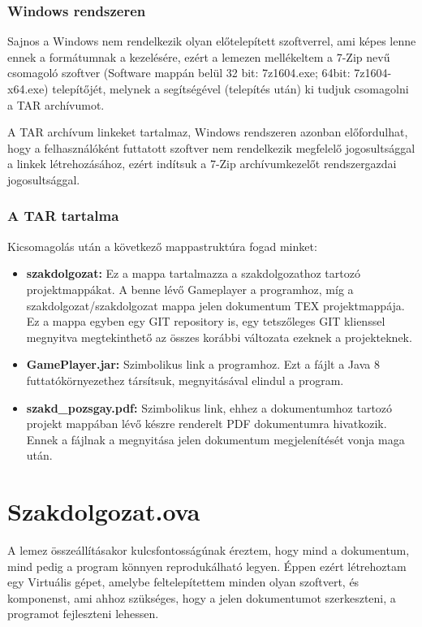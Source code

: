 \subsubsection{Windows rendszeren}
Sajnos a Windows nem rendelkezik olyan előtelepített szoftverrel, ami képes lenne ennek a formátumnak a kezelésére, ezért a lemezen mellékeltem a 7-Zip nevű csomagoló szoftver (Software mappán belül 32 bit: 7z1604.exe; 64bit: 7z1604-x64.exe) telepítőjét, melynek a segítségével (telepítés után) ki tudjuk csomagolni a TAR archívumot.

\begin{remark}
	A TAR archívum linkeket tartalmaz, Windows rendszeren azonban előfordulhat, hogy a felhasználóként futtatott szoftver nem rendelkezik megfelelő jogosultsággal a linkek létrehozásához, ezért indítsuk a 7-Zip archívumkezelőt rendszergazdai jogosultsággal.
\end{remark}

\subsubsection{A TAR tartalma}
Kicsomagolás után a következő mappastruktúra fogad minket:
\begin{itemize}
	\item \textbf{szakdolgozat:} Ez a mappa tartalmazza a szakdolgozathoz tartozó projektmappákat. A benne lévő Gameplayer a programhoz, míg a szakdolgozat/szakdolgozat mappa jelen dokumentum TEX projektmappája. Ez a mappa egyben egy GIT repository is, egy tetszőleges GIT klienssel megnyitva megtekinthető az összes korábbi változata ezeknek a projekteknek.
	\item \textbf{GamePlayer.jar:} Szimbolikus link a programhoz. Ezt a fájlt a Java 8 futtatókörnyezethez társítsuk, megnyitásával elindul a program.
	\item \textbf{szakd\_pozsgay.pdf:} Szimbolikus link, ehhez a dokumentumhoz tartozó projekt mappában lévő készre renderelt PDF dokumentumra hivatkozik. Ennek a fájlnak a megnyitása jelen dokumentum megjelenítését vonja maga után.
\end{itemize}

\section{Szakdolgozat.ova}
A lemez összeállításakor kulcsfontosságúnak éreztem, hogy mind a dokumentum, mind pedig a program könnyen reprodukálható legyen. Éppen ezért létrehoztam egy Virtuális gépet, amelybe feltelepítettem minden olyan szoftvert, és komponenst, ami ahhoz szükséges, hogy a jelen dokumentumot szerkeszteni, a programot fejleszteni lehessen.\ujsor

